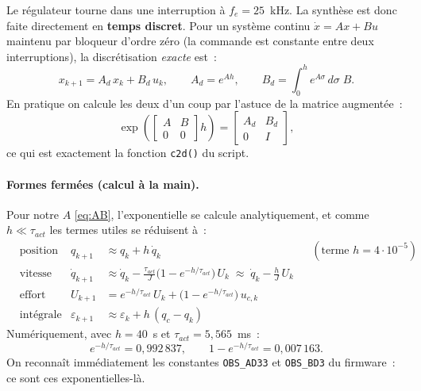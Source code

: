 \documentclass[a4paper,11pt]{article}
\newcommand{\qm}{q}
\newcommand{\e}[1]{\cdot 10^{#1}}
\begin{document}
Le régulateur tourne dans une interruption à $f_e = 25$~kHz. La synthèse est
donc faite directement en \textbf{temps discret}. Pour un système continu
$\dot x = Ax + Bu$ maintenu par bloqueur d'ordre zéro (la commande est
constante entre deux interruptions), la discrétisation \emph{exacte} est~:
\begin{equation}
    x_{k+1} = A_d\,x_k + B_d\,u_k,
    \qquad
    A_d = e^{A h},
    \qquad
    B_d = \int_0^{h} e^{A\sigma}\,d\sigma \; B .
\end{equation}
En pratique on calcule les deux d'un coup par l'astuce de la matrice
augmentée~:
\begin{equation}
    \exp\!\left( \begin{bmatrix} A & B \\ 0 & 0 \end{bmatrix} h \right)
    = \begin{bmatrix} A_d & B_d \\ 0 & I \end{bmatrix},
\end{equation}
ce qui est exactement la fonction \texttt{c2d()} du script.

\paragraph{Formes fermées (calcul à la main).}
Pour notre $A$ \eqref{eq:AB}, l'exponentielle se calcule analytiquement, et
comme $h \ll \tau_{act}$ les termes utiles se réduisent à~:
\begin{equation}
    \begin{aligned}
        &\text{position} & \qm_{k+1} &\approx \qm_k + h\,\dot{\qm}_k
            &&(\text{terme } h = 4\e{-5}) \\
        &\text{vitesse} & \dot{\qm}_{k+1} &\approx \dot{\qm}_k
            - \frac{\tau_{act}}{J}\big(1 - e^{-h/\tau_{act}}\big)\,U_k
            \;\approx\; \dot{\qm}_k - \frac{h}{J}\,U_k \\
        &\text{effort} & U_{k+1} &= e^{-h/\tau_{act}}\,U_k
            + \big(1 - e^{-h/\tau_{act}}\big)\,u_{c,k} \\
        &\text{intégrale} & \varepsilon_{k+1} &\approx \varepsilon_k
            + h\,(\qm_c - \qm_k)
    \end{aligned}
    \label{eq:discret}
\end{equation}
Numériquement, avec $h = 40$~\textmu s et $\tau_{act} = 5{,}565$~ms~:
\begin{equation}
    e^{-h/\tau_{act}} = 0{,}992\,837, \qquad 1 - e^{-h/\tau_{act}} = 0{,}007\,163 .
\end{equation}
On reconnaît immédiatement les constantes \texttt{OBS\_AD33} et
\texttt{OBS\_BD3} du firmware~: ce sont ces exponentielles-là.
\end{document}
